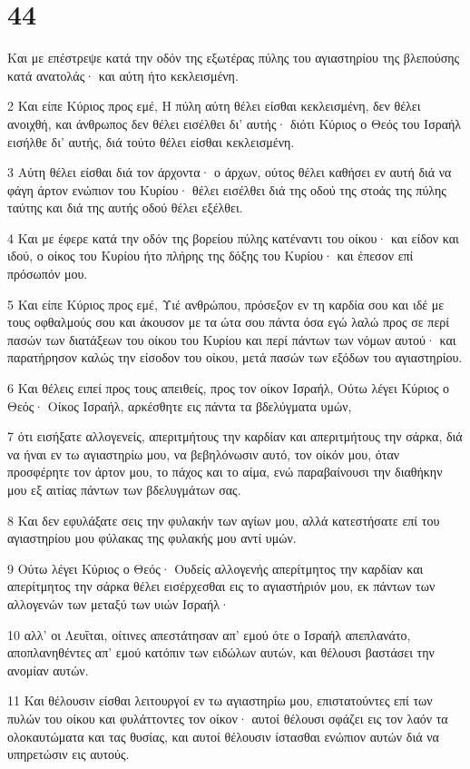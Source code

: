 \chapter{44}

\par Και με επέστρεψε κατά την οδόν της εξωτέρας πύλης του αγιαστηρίου της βλεπούσης κατά ανατολάς· και αύτη ήτο κεκλεισμένη.
\par 2 Και είπε Κύριος προς εμέ, Η πύλη αύτη θέλει είσθαι κεκλεισμένη, δεν θέλει ανοιχθή, και άνθρωπος δεν θέλει εισέλθει δι' αυτής· διότι Κύριος ο Θεός του Ισραήλ εισήλθε δι' αυτής, διά τούτο θέλει είσθαι κεκλεισμένη.
\par 3 Αύτη θέλει είσθαι διά τον άρχοντα· ο άρχων, ούτος θέλει καθήσει εν αυτή διά να φάγη άρτον ενώπιον του Κυρίου· θέλει εισέλθει διά της οδού της στοάς της πύλης ταύτης και διά της αυτής οδού θέλει εξέλθει.
\par 4 Και με έφερε κατά την οδόν της βορείου πύλης κατέναντι του οίκου· και είδον και ιδού, ο οίκος του Κυρίου ήτο πλήρης της δόξης του Κυρίου· και έπεσον επί πρόσωπόν μου.
\par 5 Και είπε Κύριος προς εμέ, Υιέ ανθρώπου, πρόσεξον εν τη καρδία σου και ιδέ με τους οφθαλμούς σου και άκουσον με τα ώτα σου πάντα όσα εγώ λαλώ προς σε περί πασών των διατάξεων του οίκου του Κυρίου και περί πάντων των νόμων αυτού· και παρατήρησον καλώς την είσοδον του οίκου, μετά πασών των εξόδων του αγιαστηρίου.
\par 6 Και θέλεις ειπεί προς τους απειθείς, προς τον οίκον Ισραήλ, Ούτω λέγει Κύριος ο Θεός· Οίκος Ισραήλ, αρκέσθητε εις πάντα τα βδελύγματα υμών,
\par 7 ότι εισήξατε αλλογενείς, απεριτμήτους την καρδίαν και απεριτμήτους την σάρκα, διά να ήναι εν τω αγιαστηρίω μου, να βεβηλόνωσιν αυτό, τον οίκόν μου, όταν προσφέρητε τον άρτον μου, το πάχος και το αίμα, ενώ παραβαίνουσι την διαθήκην μου εξ αιτίας πάντων των βδελυγμάτων σας.
\par 8 Και δεν εφυλάξατε σεις την φυλακήν των αγίων μου, αλλά κατεστήσατε επί του αγιαστηρίου μου φύλακας της φυλακής μου αντί υμών.
\par 9 Ούτω λέγει Κύριος ο Θεός· Ουδείς αλλογενής απερίτμητος την καρδίαν και απερίτμητος την σάρκα θέλει εισέρχεσθαι εις το αγιαστήριόν μου, εκ πάντων των αλλογενών των μεταξύ των υιών Ισραήλ·
\par 10 αλλ' οι Λευΐται, οίτινες απεστάτησαν απ' εμού ότε ο Ισραήλ απεπλανάτο, αποπλανηθέντες απ' εμού κατόπιν των ειδώλων αυτών, και θέλουσι βαστάσει την ανομίαν αυτών.
\par 11 Και θέλουσιν είσθαι λειτουργοί εν τω αγιαστηρίω μου, επιστατούντες επί των πυλών του οίκου και φυλάττοντες τον οίκον· αυτοί θέλουσι σφάζει εις τον λαόν τα ολοκαυτώματα και τας θυσίας, και αυτοί θέλουσιν ίστασθαι ενώπιον αυτών διά να υπηρετώσιν εις αυτούς.
